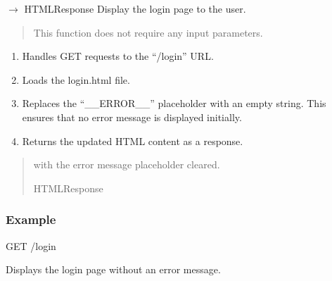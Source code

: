 \documentclass[letterpaper,10pt,english]{sphinxmanual}
\begin{document}

\begin{fulllineitems}
\label{\detokenize{modules:app.auth.login_form}}
\pysigstartsignatures
\pysiglinewithargsret
{}
{}
{{ $\rightarrow$ HTMLResponse}}
\pysigstopsignatures
\sphinxAtStartPar
Display the login page to the user.
\begin{quote}\begin{description}
\sphinxAtStartPar
{} \textendash{} This function does not require any input parameters.

\end{description}\end{quote}
\begin{description}
\begin{enumerate}
%
\item {} 
\sphinxAtStartPar
Handles GET requests to the “/login” URL.

\item {} 
\sphinxAtStartPar
Loads the login.html file.

\item {} 
\sphinxAtStartPar
Replaces the “\_\_ERROR\_\_” placeholder with an empty string.
This ensures that no error message is displayed initially.

\item {} 
\sphinxAtStartPar
Returns the updated HTML content as a response.

\end{enumerate}

\end{description}
\begin{quote}\begin{description}
\sphinxAtStartPar
\begin{description}
\sphinxAtStartPar
with the error message placeholder cleared.

\end{description}


\sphinxAtStartPar
HTMLResponse

\end{description}\end{quote}
\subsubsection*{Example}
\begin{description}
\sphinxAtStartPar
GET /login

\sphinxAtStartPar
Displays the login page without an error message.

\end{description}

\end{fulllineitems}
\end{document}
